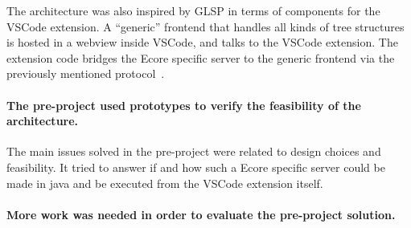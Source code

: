The architecture was also inspired by \acrshort{GLSP} in terms of components for the \gls{VSCode} extension.
A ``generic'' frontend that handles all kinds of tree structures is hosted in a webview inside \gls{VSCode}, and talks to the \gls{VSCode} extension.
The extension code bridges the \gls{Ecore} specific server to the generic frontend via the previously mentioned protocol~\cite{rekstadModelingEnvironmentCloud2020}.


\paragraph{The pre-project used prototypes to verify the feasibility of the architecture.}
The main issues solved in the pre-project were related to design choices and feasibility.
It tried to answer if and how such a \gls{Ecore} specific server could be made in java and be executed from the \gls{VSCode} extension itself.


\paragraph{More work was needed in order to evaluate the pre-project solution.}


